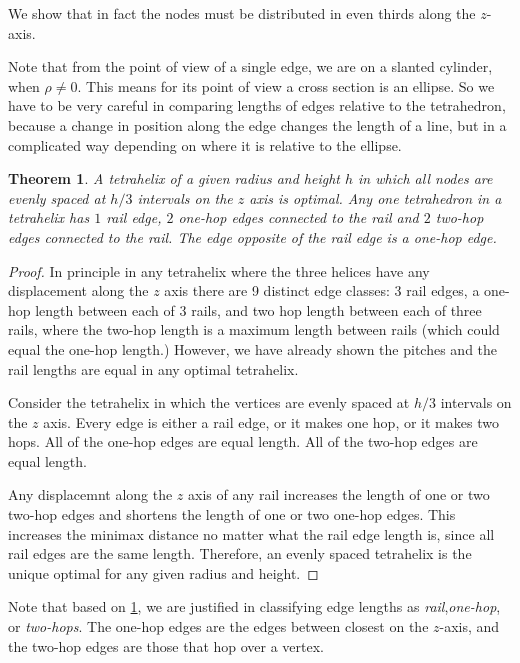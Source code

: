 \documentclass[11pt]{article}
\newtheorem{theorem}{Theorem}
\begin{document}
 We show that in fact the nodes must be distributed in even thirds
 along the $z$-axis.

 Note that from the point of view of a single edge, we are on a
 slanted cylinder, when $\rho \neq 0$.  This means for its point of
 view a cross section is an ellipse. So we have to be very careful in
 comparing lengths of edges relative to the tetrahedron, because a
 change in position along the edge changes the length of a line, but
 in a complicated way depending on where it is relative to the
 ellipse.

 \begin{theorem}
   \label{eventhirds}
   A tetrahelix of a given radius and height $h$ in which all nodes are evenly spaced at $h/3$ intervals on the $z$ axis is optimal.
     Any one tetrahedron in a tetrahelix has $1$ rail edge, $2$ one-hop edges connected to the rail and $2$ two-hop edges connected to the rail.
  The edge opposite of the rail edge is a one-hop edge.
  \end{theorem}

 \begin{proof}

   In principle in any tetrahelix where the three helices have any
   displacement along the $z$ axis there are 9 distinct edge classes:
   3 rail edges, a one-hop length between each of 3 rails, and two hop
   length between each of three rails, where the two-hop length is a
   maximum length between rails (which could equal the one-hop
   length.) However, we have already shown the pitches and the rail
   lengths are equal in any optimal tetrahelix.
   
    Consider the tetrahelix in which the vertices are evenly spaced at
    $h/3$ intervals on the $z$ axis. Every edge is either a rail edge,
    or it makes one hop, or it makes two hops. All of the one-hop
    edges are equal length.  All of the two-hop edges are equal
    length.
    
    Any displacemnt along the $z$ axis of any rail increases the
    length of one or two two-hop edges and shortens the length of one
    or two one-hop edges.  This increases the minimax distance no
    matter what the rail edge length is, since all rail edges are the
    same length. Therefore, an evenly spaced tetrahelix is the unique
    optimal for any given radius and height.
  \end{proof}
  

Note that based on \ref{eventhirds}, we are justified in classifying edge lengths as \emph{rail},\emph{one-hop}, or
\emph{two-hops}. The one-hop edges are the edges between closest on the $z$-axis, and the two-hop edges are those that hop over a vertex.
\end{document}
